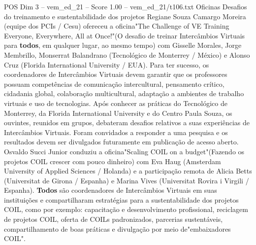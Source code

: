 \begin{textsample}{POS Dim 3 – vem\_ed\_21 – Score 1.00 – vem\_ed\_21/t106.txt}  \label{ex:f3_pos_068}
Oficinas Desafios do treinamento e sustentabilidade dos projetos Regiane Souza Camargo Moreira (equipe dos PCIs / Cesu) ofereceu a oficina"The Challenge of VE Training Everyone, Everywhere, All at Once!"(O desafio de treinar Intercâmbios Virtuais para \textbf{todos}, em qualquer lugar, ao mesmo tempo) com Gisselle Morales, Jorge Membrillo, Monserrat Balandrano (Tecnológico de Monterrey / México) e Alonso Cruz (Florida International University / EUA).
Para ter sucesso, os coordenadores de Intercâmbios Virtuais devem garantir que os professores possuam competências de comunicação intercultural, pensamento crítico, cidadania global, colaboração multicultural, adaptação a ambientes de trabalho virtuais e uso de tecnologias.
Após conhecer as práticas do Tecnológico de Monterrey, da Florida International University e do Centro Paula Souza, os ouvintes, reunidos em grupos, debateram desafios relativos a suas experiências de Intercâmbios Virtuais.
Foram convidados a responder a uma pesquisa e os resultados devem ser divulgados futuramente em publicação de acesso aberto.
Osvaldo Succi Junior conduziu a oficina"Scaling COIL on a budget"(Fazendo os projetos COIL crescer com pouco dinheiro) com Eva Haug (Amsterdam University of Applied Sciences / Holanda) e a participação remota de Alicia Betts (Universitat de Girona / Espanha) e Marina Vives (Universitat Rovira i Virgili / Espanha). \textbf{Todos} são coordenadores de Intercâmbios Virtuais em suas instituições e compartilharam estratégias para a sustentabilidade dos projetos COIL, como por exemplo: capacitação e desenvolvimento profissional, reciclagem de projetos COIL, oferta de COILs padronizados, parcerias sustentáveis, compartilhamento de boas práticas e divulgação por meio de"embaixadores COIL".

\end{textsample}
